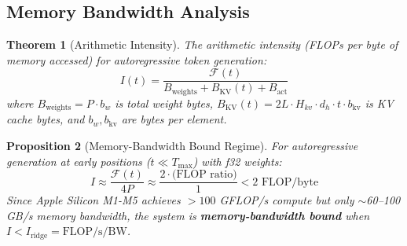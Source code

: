 \documentclass[12pt,a4paper]{article}
\newtheorem{theorem}{Theorem}[section]
\newtheorem{proposition}[theorem]{Proposition}
\begin{document}
\subsection{Memory Bandwidth Analysis}

\begin{theorem}[Arithmetic Intensity]
\label{thm:intensity}
The arithmetic intensity (FLOPs per byte of memory accessed) for autoregressive token generation:
\begin{equation}
I(t) = \frac{\mathcal{F}(t)}{B_{\text{weights}} + B_{\text{KV}}(t) + B_{\text{act}}}
\label{eq:intensity}
\end{equation}
where $B_{\text{weights}} = P \cdot b_w$ is total weight bytes, $B_{\text{KV}}(t) = 2L \cdot H_{kv} \cdot d_h \cdot t \cdot b_{\text{kv}}$ is KV cache bytes, and $b_w, b_{\text{kv}}$ are bytes per element.
\end{theorem}

\begin{proposition}[Memory-Bandwidth Bound Regime]
\label{prop:bandwidth}
For autoregressive generation at early positions ($t \ll T_{\max}$) with f32 weights:
\begin{equation}
I \approx \frac{\mathcal{F}(t)}{4P} \approx \frac{2 \cdot \text{(FLOP ratio)}}{1} < 2 \text{ FLOP/byte}
\end{equation}
Since Apple Silicon M1-M5 achieves $>100$ GFLOP/s compute but only $\sim$60--100 GB/s memory bandwidth, the system is \textbf{memory-bandwidth bound} when $I < I_{\text{ridge}} = \text{FLOP/s} / \text{BW}$.
\end{proposition}
\end{document}
